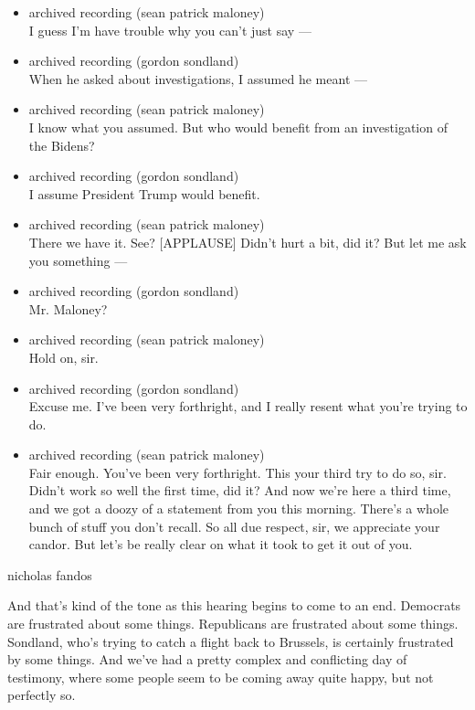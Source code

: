 \begin{itemize}
\item
  archived recording (sean patrick maloney)\\
  I guess I'm have trouble why you can't just say ---
\item
  archived recording (gordon sondland)\\
  When he asked about investigations, I assumed he meant ---
\item
  archived recording (sean patrick maloney)\\
  I know what you assumed. But who would benefit from an investigation
  of the Bidens?
\item
  archived recording (gordon sondland)\\
  I assume President Trump would benefit.
\item
  archived recording (sean patrick maloney)\\
  There we have it. See? {[}APPLAUSE{]} Didn't hurt a bit, did it? But
  let me ask you something ---
\item
  archived recording (gordon sondland)\\
  Mr. Maloney?
\item
  archived recording (sean patrick maloney)\\
  Hold on, sir.
\item
  archived recording (gordon sondland)\\
  Excuse me. I've been very forthright, and I really resent what you're
  trying to do.
\item
  archived recording (sean patrick maloney)\\
  Fair enough. You've been very forthright. This your third try to do
  so, sir. Didn't work so well the first time, did it? And now we're
  here a third time, and we got a doozy of a statement from you this
  morning. There's a whole bunch of stuff you don't recall. So all due
  respect, sir, we appreciate your candor. But let's be really clear on
  what it took to get it out of you.
\end{itemize}

nicholas fandos

And that's kind of the tone as this hearing begins to come to an end.
Democrats are frustrated about some things. Republicans are frustrated
about some things. Sondland, who's trying to catch a flight back to
Brussels, is certainly frustrated by some things. And we've had a pretty
complex and conflicting day of testimony, where some people seem to be
coming away quite happy, but not perfectly so.

